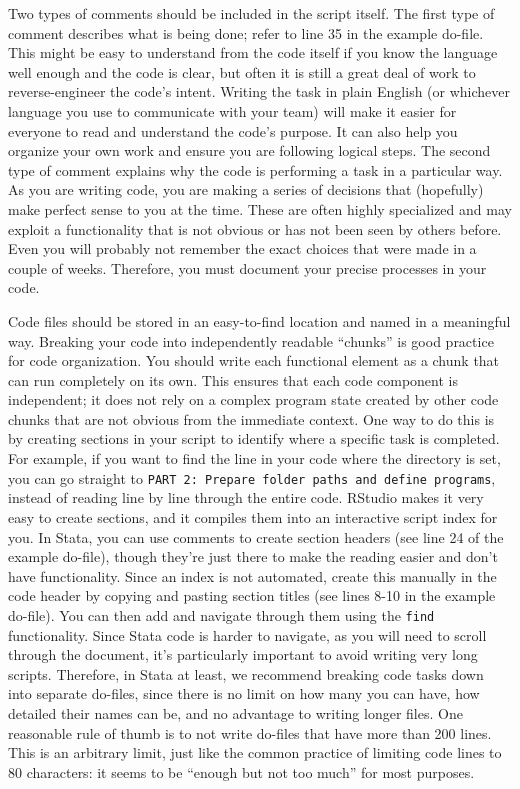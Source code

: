 Two types of comments should be included in the script itself.
The first type of comment describes what is being done;
refer to line 35 in the example do-file.
This might be easy to understand from the code itself
if you know the language well enough and the code is clear,
but often it is still a great deal of work to reverse-engineer the code's intent.
Writing the task in plain English (or whichever language you use to communicate with your team)
will make it easier for everyone to read and understand the code's purpose.
It can also help you organize your own work and ensure you are following logical steps.
The second type of comment explains why the code is performing a task in a particular way.
As you are writing code, you are making a series of decisions that
(hopefully) make perfect sense to you at the time.
These are often highly specialized and may exploit a functionality
that is not obvious or has not been seen by others before.
Even you will probably not remember the exact choices that were made in a couple of weeks.
Therefore, you must document your precise processes in your code.

Code files should be stored in an easy-to-find location and named in a meaningful way.
Breaking your code into independently readable ``chunks'' is good practice for code organization.
You should write each functional element as a chunk that can run completely on its own.
This ensures that each code component is independent;
it does not rely on a complex program state
created by other code chunks that are not obvious from the immediate context.
One way to do this is by creating sections in your script to identify where a specific task is completed.
For example, if you want to find the line in your code where the directory is set,
you can go straight to \texttt{PART 2: Prepare folder paths and define programs},
instead of reading line by line through the entire code.
RStudio makes it very easy to create sections,
and it compiles them into an interactive script index for you.
In Stata, you can use comments to create section headers
(see line 24 of the example do-file),
though they're just there to make the reading easier and don't have functionality.
Since an index is not automated,
create this manually in the code header by copying and pasting section titles
(see lines 8-10 in the example do-file).
You can then add and navigate through them using the \texttt{find} functionality.
Since Stata code is harder to navigate, as you will need to scroll through the document,
it's particularly important to avoid writing very long scripts.
Therefore, in Stata at least, we recommend breaking code tasks down
into separate do-files, since there is no limit on how many you can have,
how detailed their names can be, and no advantage to writing longer files.
One reasonable rule of thumb is to not write do-files that have more than 200 lines.
This is an arbitrary limit, just like the common practice of limiting code lines to 80 characters:
it seems to be ``enough but not too much'' for most purposes.

